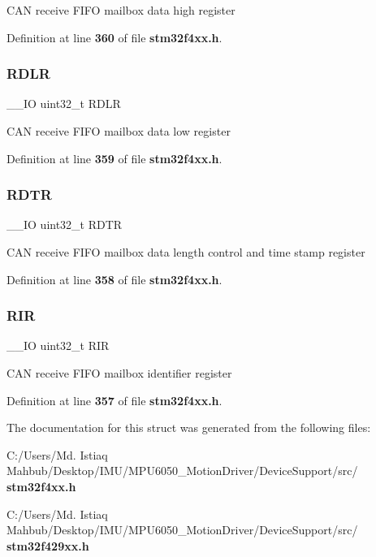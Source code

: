 C\+AN receive F\+I\+FO mailbox data high register 

Definition at line \textbf{ 360} of file \textbf{ stm32f4xx.\+h}.

\mbox{\label{structCAN__FIFOMailBox__TypeDef_ae1c569688eedd49219cd505b9c22121b}} 
\subsubsection{R\+D\+LR}
{\footnotesize\ttfamily \+\_\+\+\_\+\+IO uint32\+\_\+t R\+D\+LR}

C\+AN receive F\+I\+FO mailbox data low register 

Definition at line \textbf{ 359} of file \textbf{ stm32f4xx.\+h}.

\mbox{\label{structCAN__FIFOMailBox__TypeDef_a9563d8a88d0db403b8357331bea83a2e}} 
\subsubsection{R\+D\+TR}
{\footnotesize\ttfamily \+\_\+\+\_\+\+IO uint32\+\_\+t R\+D\+TR}

C\+AN receive F\+I\+FO mailbox data length control and time stamp register 

Definition at line \textbf{ 358} of file \textbf{ stm32f4xx.\+h}.

\mbox{\label{structCAN__FIFOMailBox__TypeDef_a0acc8eb90b17bef5b9e03c7ddaacfb0b}} 
\subsubsection{R\+IR}
{\footnotesize\ttfamily \+\_\+\+\_\+\+IO uint32\+\_\+t R\+IR}

C\+AN receive F\+I\+FO mailbox identifier register 

Definition at line \textbf{ 357} of file \textbf{ stm32f4xx.\+h}.



The documentation for this struct was generated from the following files\+:\begin{DoxyCompactItemize}
\item 
C\+:/\+Users/\+Md. Istiaq Mahbub/\+Desktop/\+I\+M\+U/\+M\+P\+U6050\+\_\+\+Motion\+Driver/\+Device\+Support/src/\textbf{ stm32f4xx.\+h}\item 
C\+:/\+Users/\+Md. Istiaq Mahbub/\+Desktop/\+I\+M\+U/\+M\+P\+U6050\+\_\+\+Motion\+Driver/\+Device\+Support/src/\textbf{ stm32f429xx.\+h}\end{DoxyCompactItemize}
